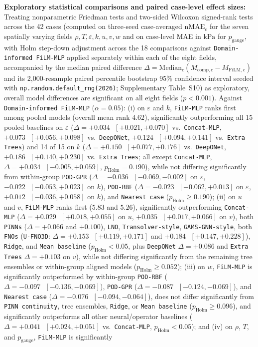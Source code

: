 \documentclass[11pt]{article}
\begin{document}
\noindent\textbf{Exploratory statistical comparisons and paired case-level effect sizes:} Treating nonparametric Friedman tests and two-sided Wilcoxon signed-rank tests across the 42 cases (computed on three-seed case-averaged $\mathrm{nMAE}_c$ for the seven spatially varying fields $\rho, T, \varepsilon, k, u, v, w$ and on case-level MAE in $\text{kPa}$ for $p_{\mathrm{gauge}}$, with Holm step-down adjustment across the 18 comparisons against \texttt{Domain-informed FiLM-MLP} applied separately within each of the eight fields, accompanied by the median paired difference $\Delta = \mathrm{Median}_c(M_{\mathrm{comp},c} - M_{\mathrm{FiLM},c})$ and its 2,000-resample paired percentile bootstrap 95\% confidence interval seeded with \texttt{np.random.default\_rng(2026)}; Supplementary Table~S10) as exploratory, overall model differences are significant on all eight fields ($p < 0.001$). Against \texttt{Domain-informed FiLM-MLP} ($\alpha = 0.05$): (i) on $\varepsilon$ and $k$, \texttt{FiLM-MLP} ranks first among pooled models (overall mean rank $4.62$), significantly outperforming all 15 pooled baselines on $\varepsilon$ ($\Delta = +0.034\text{ }[+0.021,+0.070]$ vs.\ \texttt{Concat-MLP}, $+0.073\text{ }[+0.056,+0.098]$ vs.\ \texttt{DeepONet}, $+0.124\text{ }[+0.094,+0.141]$ vs.\ \texttt{Extra Trees}) and 14 of 15 on $k$ ($\Delta = +0.150\text{ }[+0.077,+0.176]$ vs.\ \texttt{DeepONet}, $+0.186\text{ }[+0.140,+0.230]$ vs.\ \texttt{Extra Trees}; all except \texttt{Concat-MLP}, $\Delta = +0.034\text{ }[-0.005,+0.059]$, $p_{\mathrm{Holm}} = 0.190$), while not differing significantly from within-group \texttt{POD-GPR} ($\Delta = -0.036\text{ }[-0.069,-0.002]$ on $\varepsilon$, $-0.022\text{ }[-0.053,+0.023]$ on $k$), \texttt{POD-RBF} ($\Delta = -0.023\text{ }[-0.062,+0.013]$ on $\varepsilon$, $+0.012\text{ }[-0.036,+0.058]$ on $k$), and \texttt{Nearest case} ($p_{\mathrm{Holm}} \ge 0.190$); (ii) on $u$ and $v$, \texttt{FiLM-MLP} ranks first ($5.83$ and $5.26$), significantly outperforming \texttt{Concat-MLP} ($\Delta = +0.029\text{ }[+0.018,+0.055]$ on $u$, $+0.035\text{ }[+0.017,+0.066]$ on $v$), both \texttt{PINNs} ($\Delta = +0.066$ and $+0.100$), \texttt{LNO}, \texttt{Transolver-style}, \texttt{GAMS-GNN-style}, both \texttt{FNOs} (\texttt{U-FNO3D}: $\Delta = +0.153\text{ }[+0.119,+0.171]$ and $+0.184\text{ }[+0.147,+0.228]$), \texttt{Ridge}, and \texttt{Mean baseline} ($p_{\mathrm{Holm}} < 0.05$, plus \texttt{DeepONet} $\Delta = +0.086$ and \texttt{Extra Trees} $\Delta = +0.103$ on $v$), while not differing significantly from the remaining tree ensembles or within-group aligned models ($p_{\mathrm{Holm}} \ge 0.052$); (iii) on $w$, \texttt{FiLM-MLP} is significantly outperformed by within-group \texttt{POD-RBF} ($\Delta = -0.097\text{ }[-0.136,-0.069]$), \texttt{POD-GPR} ($\Delta = -0.087\text{ }[-0.124,-0.069]$), and \texttt{Nearest case} ($\Delta = -0.076\text{ }[-0.094,-0.064]$), does not differ significantly from \texttt{PINN continuity}, tree ensembles, \texttt{Ridge}, or \texttt{Mean baseline} ($p_{\mathrm{Holm}} \ge 0.096$), and significantly outperforms all other neural/operator baselines ($\Delta = +0.041\text{ }[+0.024,+0.051]$ vs.\ \texttt{Concat-MLP}, $p_{\mathrm{Holm}} < 0.05$); and (iv) on $\rho$, $T$, and $p_{\mathrm{gauge}}$, \texttt{FiLM-MLP} is significantly 
\end{document}
